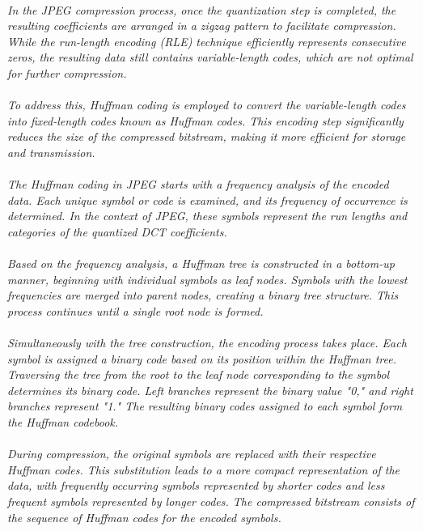 \documentclass[12pt, letterpaper]{article}
\begin{document}
\paragraph{}\textit{In the JPEG compression process, once the quantization step is completed, the resulting coefficients are arranged in a zigzag pattern to facilitate compression. While the run-length encoding (RLE) technique efficiently represents consecutive zeros, the resulting data still contains variable-length codes, which are not optimal for further compression.   }
\paragraph{}\textit{To address this, Huffman coding is employed to convert the variable-length codes into fixed-length codes known as Huffman codes. This encoding step significantly reduces the size of the compressed bitstream, making it more efficient for storage and transmission. }
\paragraph{}\textit{The Huffman coding in JPEG starts with a frequency analysis of the encoded data. Each unique symbol or code is examined, and its frequency of occurrence is determined. In the context of JPEG, these symbols represent the run lengths and categories of the quantized DCT coefficients. }
\paragraph{}\textit{Based on the frequency analysis, a Huffman tree is constructed in a bottom-up manner, beginning with individual symbols as leaf nodes. Symbols with the lowest frequencies are merged into parent nodes, creating a binary tree structure. This process continues until a single root node is formed. }
\paragraph{}\textit{Simultaneously with the tree construction, the encoding process takes place. Each symbol is assigned a binary code based on its position within the Huffman tree. Traversing the tree from the root to the leaf node corresponding to the symbol determines its binary code. Left branches represent the binary value "0," and right branches represent "1." The resulting binary codes assigned to each symbol form the Huffman codebook. }
\paragraph{}\textit{During compression, the original symbols are replaced with their respective Huffman codes. This substitution leads to a more compact representation of the data, with frequently occurring symbols represented by shorter codes and less frequent symbols represented by longer codes. The compressed bitstream consists of the sequence of Huffman codes for the encoded symbols. }
\end{document}
